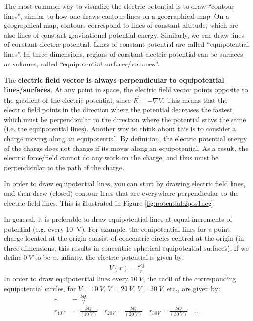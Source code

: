 The most common way to visualize the electric potential is to draw ``contour lines'', similar to how one draws contour lines on a geographical map. On a geographical map, contours correspond to lines of constant altitude, which are also lines of constant gravitational potential energy. Similarly, we can draw lines of constant electric potential. Lines of constant potential are called ``equipotential lines''. In three dimensions, regions of constant electric potential can be surfaces or volumes, called ``equipotential surfaces/volumes''. 


The \textbf{electric field vector is always perpendicular to equipotential lines/surfaces}. At any point in space, the electric field vector points opposite to the gradient of the electric potential, since $\vec E=-\nabla V$. This means that the electric field points in the direction where the potential decreases the fastest, which must be perpendicular to the direction where the potential stays the same (i.e. the equipotential lines). Another way to think about this is to consider a charge moving along an equipotential. By definition, the electric potential energy of the charge does not change if its moves along an equipotential. As a result, the electric force/field cannot do any work on the charge, and thus must be perpendicular to the path of the charge.


In order to draw equipotential lines, you can start by drawing electric field lines, and then draw (closed) contour lines that are everywhere perpendicular to the electric field lines. This is illustrated in Figure \ref{fig:potential:2pos1neg}. 


In general, it is preferable to draw equipotential lines at equal increments of potential (e.g. every \SI{10}{V}). For example, the equipotential lines for a point charge located at the origin consist of concentric circles centred at the origin (in three dimensions, this results in concentric spherical equipotential surfaces). If we define $\SI{0}{V}$ to be at infinity, the electric potential is given by:
\begin{align*}
V(r)=\frac{kQ}{r}
\end{align*}
In order to draw equipotential lines every $\SI{10}{V}$, the radii of the corresponding equipotential circles, for $V=\SI{10}{V}$, $V=\SI{20}{V}$, $V=\SI{30}{V}$, etc., are given by:
\begin{align*}
r&=\frac{kQ}{V}\\
r_{10V}&=\frac{kQ}{(\SI{10}{V})}\quad r_{20V}=\frac{kQ}{(\SI{20}{V})}\quad r_{30V}=\frac{kQ}{(\SI{30}{V})}\quad \dots
\end{align*}

